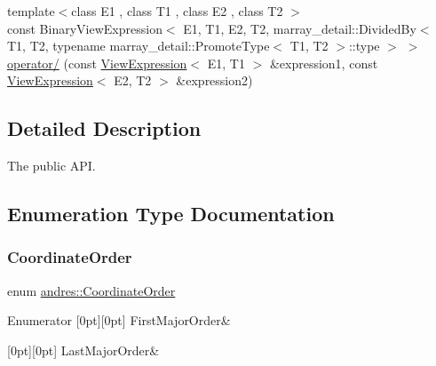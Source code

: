 \begin{DoxyCompactItemize}
\item 
{\footnotesize template$<$class E1 , class T1 , class E2 , class T2 $>$ }\\const Binary\+View\+Expression$<$ E1, T1, E2, T2, marray\+\_\+detail\+::\+Divided\+By$<$ T1, T2, typename marray\+\_\+detail\+::\+Promote\+Type$<$ T1, T2 $>$\+::type $>$ $>$ \hyperlink{namespaceandres_ae804c627d02a5db6e2e16f020dfd1683}{operator/} (const \hyperlink{classandres_1_1ViewExpression}{View\+Expression}$<$ E1, T1 $>$ \&expression1, const \hyperlink{classandres_1_1ViewExpression}{View\+Expression}$<$ E2, T2 $>$ \&expression2)
\end{DoxyCompactItemize}


\subsection{Detailed Description}
The public A\+PI. 

\subsection{Enumeration Type Documentation}
\mbox{\label{namespaceandres_a2ac8b7aa89d44e8188a7c0ba50f4306b}} 
\subsubsection{\texorpdfstring{Coordinate\+Order}{CoordinateOrder}}
{\footnotesize\ttfamily enum \hyperlink{namespaceandres_a2ac8b7aa89d44e8188a7c0ba50f4306b}{andres\+::\+Coordinate\+Order}}

\begin{DoxyEnumFields}{Enumerator}
[0pt][0pt]{}\mbox{\label{namespaceandres_a2ac8b7aa89d44e8188a7c0ba50f4306ba88e74e8570fc8b1bee29f708f391fe69}} 
First\+Major\+Order&\\
\hline

[0pt][0pt]{}\mbox{\label{namespaceandres_a2ac8b7aa89d44e8188a7c0ba50f4306ba586bd03d7519be47cac8605d4833b7ae}} 
Last\+Major\+Order&\\
\hline

\end{DoxyEnumFields}
\mbox{\label{namespaceandres_a69f07c437d156c7028c7d619e566281f}} 
